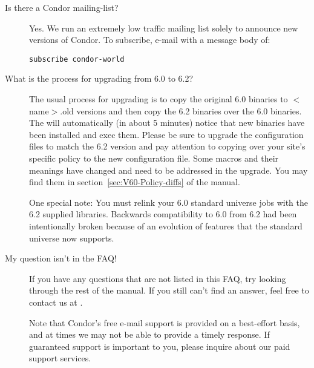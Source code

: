 \begin{description}

\item[Is there a Condor mailing-list?]

Yes.
We run an extremely low traffic mailing list solely to announce new
versions of Condor.
To subscribe, e-mail  with a message body
of:

\begin{verbatim}subscribe condor-world\end{verbatim}



\item[What is the process for upgrading from 6.0 to 6.2?]

The usual process for upgrading is to copy the original 6.0 binaries
to $<$name$>$.old versions and then copy the 6.2 binaries over the 6.0
binaries. The  will automatically (in about 5 minutes)
notice that new binaries have been installed and exec them. Please be sure
to upgrade the configuration files to match the 6.2 version and pay attention
to copying over your site's specific policy to the new configuration file. Some
macros and their meanings have changed and need to be addressed in the
upgrade. You may find them in section~\ref{sec:V60-Policy-diffs} of the
manual.

One special note: You must relink your 6.0 standard universe jobs with
the 6.2 supplied libraries. Backwards compatibility to 6.0 from 6.2 had
been intentionally broken because of an evolution of features that the
standard universe now supports.

\item[My question isn't in the FAQ!]

If you have any questions that are not listed in this FAQ, try looking
through the rest of the manual.
If you still can't find an answer, feel free to contact us at
.

Note that Condor's free e-mail support is provided on a best-effort
basis, and at times we may not be able to provide a timely response.
If guaranteed support is important to you, please inquire about our
paid support services.
\end{description}



